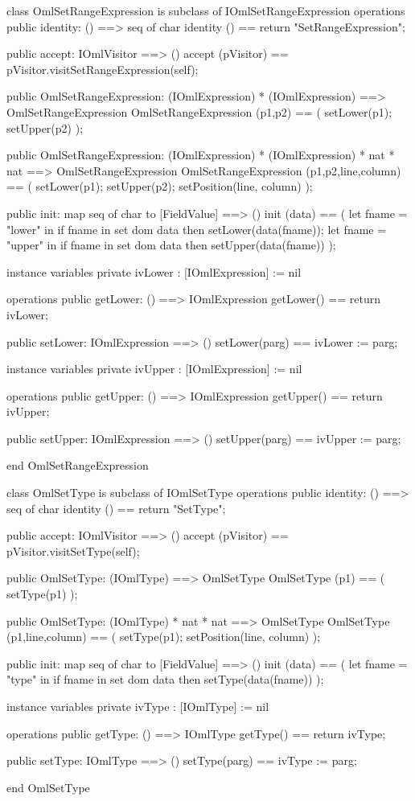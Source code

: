 \begin{vdm_al}
class OmlSetRangeExpression is subclass of IOmlSetRangeExpression
operations
  public identity: () ==> seq of char
  identity () == return "SetRangeExpression";

  public accept: IOmlVisitor ==> ()
  accept (pVisitor) == pVisitor.visitSetRangeExpression(self);

  public OmlSetRangeExpression:
    (IOmlExpression) *
    (IOmlExpression) ==> OmlSetRangeExpression
  OmlSetRangeExpression (p1,p2) == 
    ( setLower(p1);
      setUpper(p2) );

  public OmlSetRangeExpression:
    (IOmlExpression) *
    (IOmlExpression) *
    nat *
    nat ==> OmlSetRangeExpression
  OmlSetRangeExpression (p1,p2,line,column) == 
    ( setLower(p1);
      setUpper(p2);
      setPosition(line, column) );

  public init: map seq of char to [FieldValue] ==> ()
  init (data) ==
    ( let fname = "lower" in
        if fname in set dom data
        then setLower(data(fname));
      let fname = "upper" in
        if fname in set dom data
        then setUpper(data(fname)) );

instance variables
  private ivLower : [IOmlExpression] := nil

operations
  public getLower: () ==> IOmlExpression
  getLower() == return ivLower;

  public setLower: IOmlExpression ==> ()
  setLower(parg) == ivLower := parg;

instance variables
  private ivUpper : [IOmlExpression] := nil

operations
  public getUpper: () ==> IOmlExpression
  getUpper() == return ivUpper;

  public setUpper: IOmlExpression ==> ()
  setUpper(parg) == ivUpper := parg;

end OmlSetRangeExpression
\end{vdm_al}

\begin{vdm_al}
class OmlSetType is subclass of IOmlSetType
operations
  public identity: () ==> seq of char
  identity () == return "SetType";

  public accept: IOmlVisitor ==> ()
  accept (pVisitor) == pVisitor.visitSetType(self);

  public OmlSetType:
    (IOmlType) ==> OmlSetType
  OmlSetType (p1) == 
    ( setType(p1) );

  public OmlSetType:
    (IOmlType) *
    nat *
    nat ==> OmlSetType
  OmlSetType (p1,line,column) == 
    ( setType(p1);
      setPosition(line, column) );

  public init: map seq of char to [FieldValue] ==> ()
  init (data) ==
    ( let fname = "type" in
        if fname in set dom data
        then setType(data(fname)) );

instance variables
  private ivType : [IOmlType] := nil

operations
  public getType: () ==> IOmlType
  getType() == return ivType;

  public setType: IOmlType ==> ()
  setType(parg) == ivType := parg;

end OmlSetType
\end{vdm_al}


